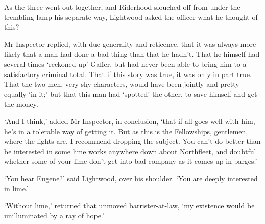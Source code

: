 As the three went out together, and Riderhood slouched off from under
the trembling lamp his separate way, Lightwood asked the officer what he
thought of this?

Mr Inspector replied, with due generality and reticence, that it was
always more likely that a man had done a bad thing than that he hadn’t.
That he himself had several times ‘reckoned up’ Gaffer, but had never
been able to bring him to a satisfactory criminal total. That if this
story was true, it was only in part true. That the two men, very shy
characters, would have been jointly and pretty equally ‘in it;’ but that
this man had ‘spotted’ the other, to save himself and get the money.

‘And I think,’ added Mr Inspector, in conclusion, ‘that if all goes
well with him, he’s in a tolerable way of getting it. But as this is the
Fellowships, gentlemen, where the lights are, I recommend dropping
the subject. You can’t do better than be interested in some lime works
anywhere down about Northfleet, and doubtful whether some of your lime
don’t get into bad company as it comes up in barges.’

‘You hear Eugene?’ said Lightwood, over his shoulder. ‘You are deeply
interested in lime.’

‘Without lime,’ returned that unmoved barrister-at-law, ‘my existence
would be unilluminated by a ray of hope.’



